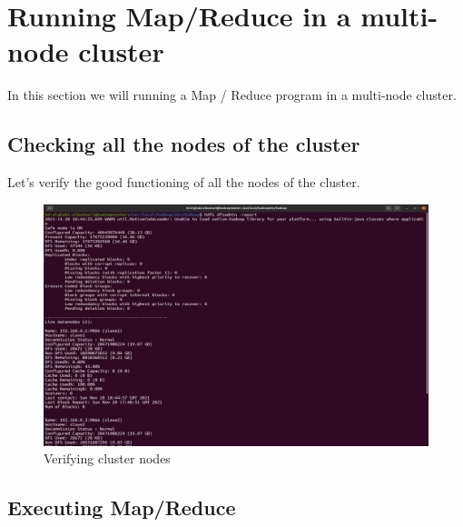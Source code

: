 \chapter{Running Map/Reduce in a multi-node cluster}
\par In this section we will running a Map / Reduce program in a multi-node cluster.
\begin{spacing}{1.2}
\section{Checking all the nodes of the cluster}

\par Let's verify the good functioning of all the nodes of the cluster.
\\
\begin{figure}[!htb] 
\begin{center} 
\includegraphics[width=1\linewidth]{Big_Data/Hadoop/Multi-Nodes Map_Reduce/Verifying cluster nodes} 
\end{center} 
\caption{Verifying cluster nodes} 
\end{figure} 
\FloatBarrier



\section{Executing Map/Reduce}


\end{spacing}
